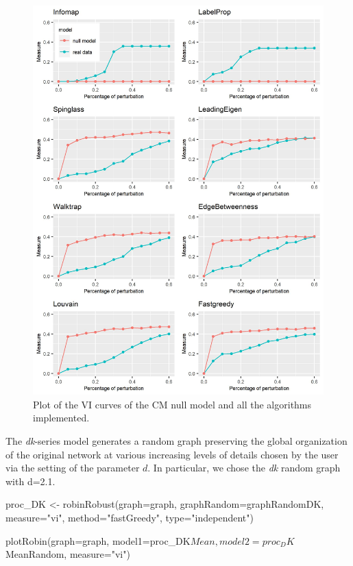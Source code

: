 \begin{figure}[h]
\centering
\includegraphics[width=14cm]{PlotConfigurationModel.png}
\caption{Plot of the VI curves of the CM null model and all the algorithms implemented.}
\label{fig:PlotConfigurationModel}
\end{figure}


The {\it dk}-series model generates a random graph preserving the global organization of the original network at various increasing levels of details chosen by the user via the setting of the parameter $d$. In particular, we chose the {\it dk} random graph with d=2.1. 

\begin{example}
proc_DK <- robinRobust(graph=graph, graphRandom=graphRandomDK, 
                       measure="vi", method="fastGreedy", type="independent")
                  
plotRobin(graph=graph, model1=proc_DK$Mean, model2=proc_DK$MeanRandom,
          measure="vi")

\end{example}


